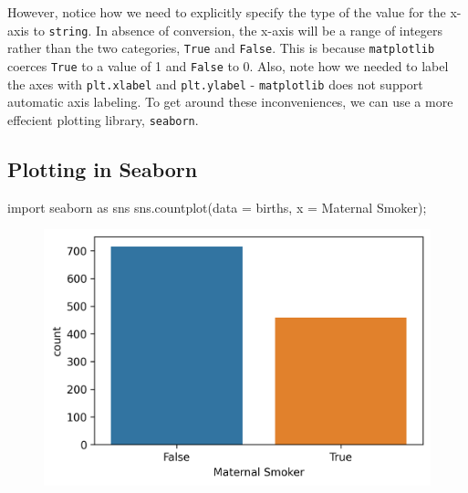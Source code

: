 \documentclass[
  letterpaper,
  DIV=11,
  numbers=noendperiod]{scrreprt}
\newenvironment{Shaded}{\begin{snugshade}}{\end{snugshade}}
\newcommand{\ImportTok}[1]{\textcolor[rgb]{0.00,0.46,0.62}{#1}}
\newcommand{\NormalTok}[1]{\textcolor[rgb]{0.00,0.23,0.31}{#1}}
\newcommand{\OperatorTok}[1]{\textcolor[rgb]{0.37,0.37,0.37}{#1}}
\newcommand{\StringTok}[1]{\textcolor[rgb]{0.13,0.47,0.30}{#1}}
\begin{document}
However, notice how we need to explicitly specify the type of the value
for the x-axis to \texttt{string}. In absence of conversion, the x-axis
will be a range of integers rather than the two categories,
\texttt{True} and \texttt{False}. This is because \texttt{matplotlib}
coerces \texttt{True} to a value of 1 and \texttt{False} to 0. Also,
note how we needed to label the axes with \texttt{plt.xlabel} and
\texttt{plt.ylabel} - \texttt{matplotlib} does not support automatic
axis labeling. To get around these inconveniences, we can use a more
effecient plotting library, \texttt{seaborn}.

\hypertarget{plotting-in-seaborn}{%
\subsection{Plotting in Seaborn}\label{plotting-in-seaborn}}

\begin{Shaded}
\begin{Highlighting}[]
\ImportTok{import}\NormalTok{ seaborn }\ImportTok{as}\NormalTok{ sns}
\NormalTok{sns.countplot(data }\OperatorTok{=}\NormalTok{ births, x }\OperatorTok{=} \StringTok{\textquotesingle{}Maternal Smoker\textquotesingle{}}\NormalTok{)}\OperatorTok{;}
\end{Highlighting}
\end{Shaded}

\begin{figure}[H]

{\centering \includegraphics{visualization_1/visualization_1_files/figure-pdf/cell-5-output-1.png}

}

\end{figure}
\end{document}
